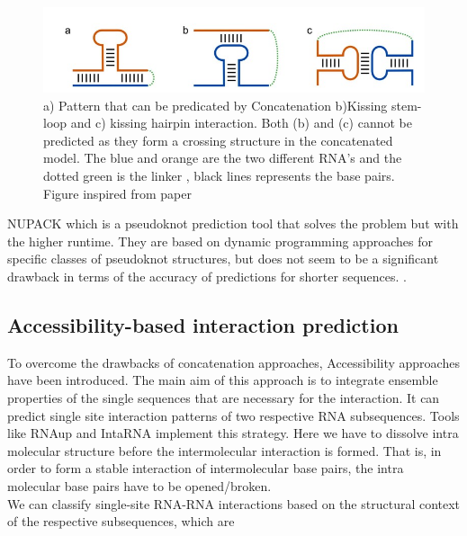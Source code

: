 \documentclass[twoside,a4paper]{report}
\begin{document}
	 \begin{figure}[tb]
		\includegraphics[width=0.9\linewidth]{concat}
		\centering
		\caption{a) Pattern that can be predicated by Concatenation b)Kissing stem-loop and c) kissing hairpin interaction. Both (b) and (c) cannot be predicted as they form a crossing structure in the concatenated model. The blue and orange are the two different RNA's and the dotted green is the linker , black lines represents the base pairs. Figure inspired from paper \citep{raden2018interactive}} 
		\label{Fig:concat}
	\end{figure}
	
	NUPACK which is a pseudoknot prediction tool that solves the problem but with the higher runtime. They are based on dynamic programming approaches for specific classes of pseudoknot structures, but does not seem to be a significant drawback in terms of the accuracy of predictions for shorter sequences. \citep{dirks2003partition}. \\
	
	\subsection{Accessibility-based interaction prediction }
	 To overcome the drawbacks of concatenation approaches, Accessibility approaches have been introduced. The main aim of this approach is to integrate ensemble properties of the single sequences that are necessary for the interaction.  It can predict single site interaction patterns of two respective RNA subsequences. Tools like RNAup and IntaRNA implement this strategy. Here we have to dissolve intra molecular structure before the intermolecular interaction is formed. That is, in order to form a stable interaction of intermolecular base pairs, the intra molecular base pairs have to be opened/broken. \\
	

	We can classify single-site RNA-RNA interactions based on the structural context of the respective subsequences, which are\\
	
\end{document}

